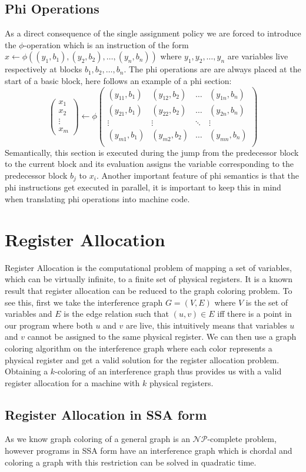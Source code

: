 \subsection{Phi Operations}
\label{subsec:phi}
As a direct consequence of the single assignment policy we are forced to introduce the $\phi$-operation which is an instruction of the form $x \leftarrow \phi((y_1, b_1), (y_2, b_2), \dots, (y_n, b_n))$ where $y_1, y_2, \dots, y_n$ are variables live respectively at blocks $b_1, b_2, \dots, b_n$.
The phi operations are are always placed at the start of a basic block, here follows an example of a phi section:
\[
\begin{pmatrix}
    x_1 \\ x_2 \\ \vdots \\ x_m
\end{pmatrix}
\leftarrow \phi
\begin{pmatrix}
    (y_{11}, b_1) & (y_{12}, b_2) & \dots & (y_{1n}, b_n) \\
    (y_{21}, b_1) & (y_{22}, b_2) & \dots & (y_{2n}, b_n) \\
    \vdots & \vdots & \ddots & \vdots \\
    (y_{m1}, b_1) & (y_{m2}, b_2) & \dots & (y_{mn}, b_n) \\
\end{pmatrix}
\]
Semantically, this section is executed during the jump from the predecessor block to the current block and its evaluation assigns the variable corresponding to the predecessor block $b_j$ to $x_i$.
Another important feature of phi semantics is that the phi instructions get executed in parallel, it is important to keep this in mind when translating phi operations into machine code.

\section{Register Allocation}
\label{sec:ra}

Register Allocation is the computational problem of mapping a set of variables, which can be virtually infinite, to a finite set of physical registers. It is a known result that register allocation can be reduced to the graph coloring problem. To see this, first we take the interference graph $G = (V, E)$ where $V$ is the set of variables and $E$ is the edge relation such that $(u, v) \in E$ iff there is a point in our program where both $u$ and $v$ are live, this intuitively means that variables $u$ and $v$ cannot be assigned to the same physical register.
We can then use a graph coloring algorithm on the interference graph where each color represents a physical register and get a valid solution for the register allocation problem.
Obtaining a $k$-coloring of an interference graph thus provides us with a valid register allocation for a machine with $k$ physical registers.

\subsection{Register Allocation in SSA form}
As we know graph coloring of a general graph is an $\mathcal{NP}$-complete problem, however programs in SSA form have an interference graph which is chordal and coloring a graph with this restriction can be solved in quadratic time.

